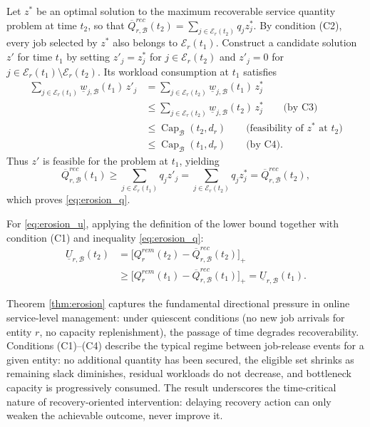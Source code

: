 \begin{pf}
Let $z^*$ be an optimal solution to the maximum recoverable service quantity problem at time $t_2$, so that $\overline Q_{r,\mathcal B}^{rec}(t_2)=\sum_{j\in\mathcal E_r(t_2)}q_j z_j^*$. By condition (C2), every job selected by $z^*$ also belongs to $\mathcal E_r(t_1)$. Construct a candidate solution $z'$ for time $t_1$ by setting $z'_j=z_j^*$ for $j\in\mathcal E_r(t_2)$ and $z'_j=0$ for $j\in\mathcal E_r(t_1)\setminus\mathcal E_r(t_2)$. Its workload consumption at $t_1$ satisfies
\begin{align}
\sum_{j\in\mathcal E_r(t_1)}\underline w_{j,\mathcal B}(t_1)\,z'_j
&=\sum_{j\in\mathcal E_r(t_2)}\underline w_{j,\mathcal B}(t_1)\,z_j^*\nonumber\\
&\le\sum_{j\in\mathcal E_r(t_2)}\underline w_{j,\mathcal B}(t_2)\,z_j^* \qquad\text{(by C3)}\nonumber\\
&\le\operatorname{Cap}_{\mathcal B}(t_2,d_r) \qquad\text{(feasibility of $z^*$ at $t_2$)}\nonumber\\
&\le\operatorname{Cap}_{\mathcal B}(t_1,d_r) \qquad\text{(by C4)}.\nonumber
\end{align}
Thus $z'$ is feasible for the problem at $t_1$, yielding
\[
\overline Q_{r,\mathcal B}^{rec}(t_1)\ge\sum_{j\in\mathcal E_r(t_1)}q_j z'_j=\sum_{j\in\mathcal E_r(t_2)}q_j z_j^*=\overline Q_{r,\mathcal B}^{rec}(t_2),
\]
which proves \eqref{eq:erosion_q}.

For \eqref{eq:erosion_u}, applying the definition of the lower bound together with condition (C1) and inequality \eqref{eq:erosion_q}:
\begin{align}
\underline U_{r,\mathcal B}(t_2)&=\big[Q_r^{rem}(t_2)-\overline Q_{r,\mathcal B}^{rec}(t_2)\big]_+\nonumber\\
&\ge\big[Q_r^{rem}(t_1)-\overline Q_{r,\mathcal B}^{rec}(t_1)\big]_+=\underline U_{r,\mathcal B}(t_1).\nonumber
\end{align}
\end{pf}

Theorem \ref{thm:erosion} captures the fundamental directional pressure in online service-level management: under quiescent conditions (no new job arrivals for entity $r$, no capacity replenishment), the passage of time degrades recoverability. Conditions (C1)--(C4) describe the typical regime between job-release events for a given entity: no additional quantity has been secured, the eligible set shrinks as remaining slack diminishes, residual workloads do not decrease, and bottleneck capacity is progressively consumed. The result underscores the time-critical nature of recovery-oriented intervention: delaying recovery action can only weaken the achievable outcome, never improve it.

